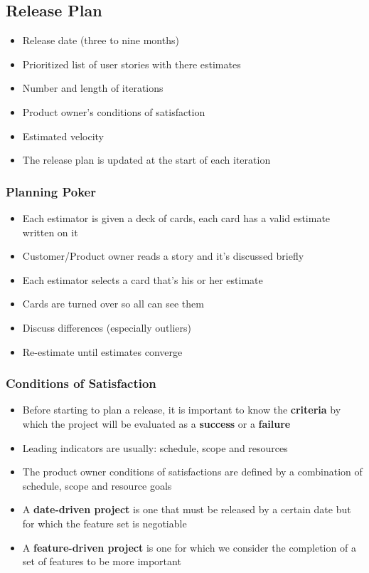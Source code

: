 \hypertarget{release-plan}{%
\subsection{Release Plan}\label{release-plan}}

\begin{itemize}
\tightlist
\item
  Release date (three to nine months)
\item
  Prioritized list of user stories with there estimates
\item
  Number and length of iterations
\item
  Product owner's conditions of satisfaction
\item
  Estimated velocity
\item
  The release plan is updated at the start of each iteration
\end{itemize}

\hypertarget{planning-poker}{%
\subsubsection{Planning Poker}\label{planning-poker}}

\begin{itemize}
\tightlist
\item
  Each estimator is given a deck of cards, each card has a valid
  estimate written on it
\item
  Customer/Product owner reads a story and it's discussed briefly
\item
  Each estimator selects a card that's his or her estimate
\item
  Cards are turned over so all can see them
\item
  Discuss differences (especially outliers)
\item
  Re-estimate until estimates converge
\end{itemize}

\hypertarget{conditions-of-satisfaction}{%
\subsubsection{Conditions of
Satisfaction}\label{conditions-of-satisfaction}}

\begin{itemize}
\tightlist
\item
  Before starting to plan a release, it is important to know the
  \textbf{criteria} by which the project will be evaluated as a
  \textbf{success} or a \textbf{failure}
\item
  Leading indicators are usually: schedule, scope and resources
\item
  The product owner conditions of satisfactions are defined by a
  combination of schedule, scope and resource goals
\item
  A \textbf{date-driven project} is one that must be released by a
  certain date but for which the feature set is negotiable
\item
  A \textbf{feature-driven project} is one for which we consider the
  completion of a set of features to be more important
\end{itemize}

